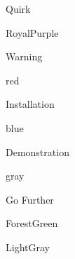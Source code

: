 \usepackage{tcolorbox}

\newcommand{\defprop}[3]{
  \expandafter\def\csname @val@#1@#2\endcsname{#3}
}

\newcommand{\getprop}[2]{%
  \ifcsname @val@#1@#2\endcsname%
  \csname @val@#1@#2\endcsname%
  \fi
}

\newcommand{\defbox}[3]{
  \defprop{#1}{title}{#2}
  \defprop{#1}{color}{#3}
}

\defbox{quirk}{Quirk}{RoyalPurple}
\defbox{warning}{Warning}{red}
\defbox{installation}{Installation}{blue}
\defbox{demo}{Demonstration}{gray}
\defbox{further}{Go Further}{ForestGreen}
\defbox{example}{}{LightGray}

\newenvironment{bookblock}[1]{
  \ifcsname @val@#1@color\endcsname
  \begin{tcolorbox}[colback=\getprop{#1}{color}!5!white,
                    colframe=\getprop{#1}{color}!75!white,
                    title={\getprop{#1}{title}}]
  \else
  \PackageError{bookblock}{Unknown book block '#1'}{}
  \fi
}{
\end{tcolorbox}
}

